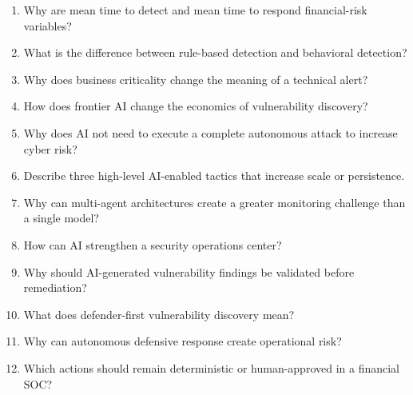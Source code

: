 \begin{enumerate}
    \item Why are mean time to detect and mean time to respond financial-risk variables?
    \item What is the difference between rule-based detection and behavioral detection?
    \item Why does business criticality change the meaning of a technical alert?
    \item How does frontier AI change the economics of vulnerability discovery?
    \item Why does AI not need to execute a complete autonomous attack to increase cyber risk?
    \item Describe three high-level AI-enabled tactics that increase scale or persistence.
    \item Why can multi-agent architectures create a greater monitoring challenge than a single model?
    \item How can AI strengthen a security operations center?
    \item Why should AI-generated vulnerability findings be validated before remediation?
    \item What does defender-first vulnerability discovery mean?
    \item Why can autonomous defensive response create operational risk?
    \item Which actions should remain deterministic or human-approved in a financial SOC?
\end{enumerate}
